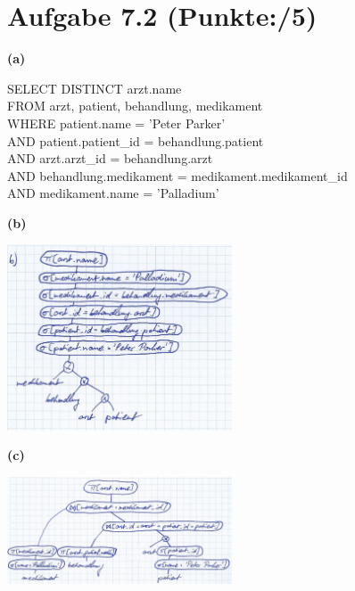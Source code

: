 \documentclass[11pt, a4paper]{article}
\newcommand{\blattnummer}{7}
\newcommand{\pp}{5}
\newcommand{\aufgabe}[2] {\section*{Aufgabe \blattnummer.#1 (Punkte:\qquad/#2)}}
\newcommand{\aufgabenteil}[1] {\textbf{(#1)}}
\begin{document}
\aufgabe{2}{\pp}
\aufgabenteil{a}
\begin{adjustwidth}{20pt}{20pt}
\begin{tt}
SELECT DISTINCT arzt.name\\
FROM arzt, patient, behandlung, medikament\\
WHERE patient.name = 'Peter Parker'\\
\null\qquad AND patient.patient\_id = behandlung.patient\\
\null\qquad AND arzt.arzt\_id = behandlung.arzt\\
\null\qquad AND behandlung.medikament = medikament.medikament\_id\\
\null\qquad AND medikament.name = 'Palladium'\\
\end{tt}
\end{adjustwidth}
\aufgabenteil{b}
\begin{adjustwidth}{20pt}{20pt}
\begin{center}
\includegraphics[width=0.5\textwidth]{a2b.jpg}
\end{center}
\end{adjustwidth}
\aufgabenteil{c}
\begin{adjustwidth}{20pt}{20pt}
\begin{center}
\includegraphics[width=0.5\textwidth]{a2c.jpg}
\end{center}
\end{adjustwidth}
\end{document}
